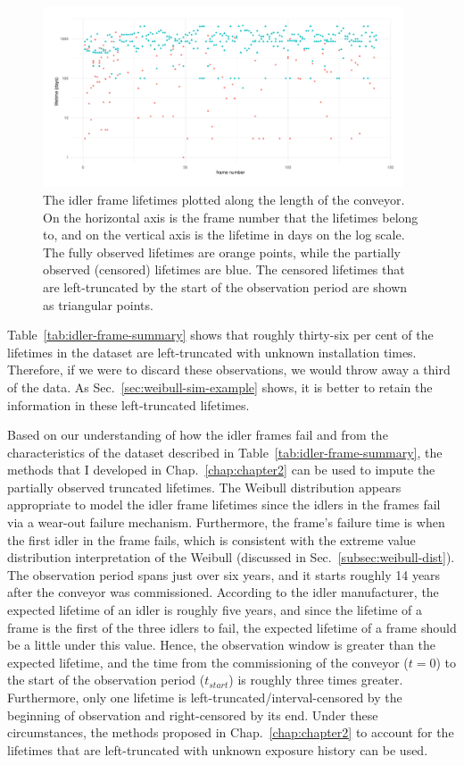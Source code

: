 \begin{figure}[tbp]
  \centering
  \includegraphics[width=0.95\textwidth]{./figures/ch-3/idler-frame-data.pdf}
  \caption{The idler frame lifetimes plotted along the length of the conveyor. On the horizontal axis is the frame number that the lifetimes belong to, and on the vertical axis is the lifetime in days on the log scale. The fully observed lifetimes are orange points, while the partially observed (censored) lifetimes are blue. The censored lifetimes that are left-truncated by the start of the observation period are shown as triangular points.}
  \label{fig:idler-frames-data}
\end{figure}

Table~\ref{tab:idler-frame-summary} shows that roughly thirty-six per cent of the lifetimes in the dataset are left-truncated with unknown installation times. Therefore, if we were to discard these observations, we would throw away a third of the data. As Sec.~\ref{sec:weibull-sim-example} shows, it is better to retain the information in these left-truncated lifetimes.

Based on our understanding of how the idler frames fail and from the characteristics of the dataset described in Table~\ref{tab:idler-frame-summary}, the methods that I developed in Chap.~\ref{chap:chapter2} can be used to impute the partially observed truncated lifetimes. The Weibull distribution appears appropriate to model the idler frame lifetimes since the idlers in the frames fail via a wear-out failure mechanism. Furthermore, the frame's failure time is when the first idler in the frame fails, which is consistent with the extreme value distribution interpretation of the Weibull (discussed in Sec.~\ref{subsec:weibull-dist}). The observation period spans just over six years, and it starts roughly 14 years after the conveyor was commissioned. According to the idler manufacturer, the expected lifetime of an idler is roughly five years, and since the lifetime of a frame is the first of the three idlers to fail, the expected lifetime of a frame should be a little under this value. Hence, the observation window is greater than the expected lifetime, and the time from the commissioning of the conveyor ($t = 0$) to the start of the observation period ($t_{start}$) is roughly three times greater. Furthermore, only one lifetime is left-truncated/interval-censored by the beginning of observation and right-censored by its end. Under these circumstances, the methods proposed in Chap.~\ref{chap:chapter2} to account for the lifetimes that are left-truncated with unknown exposure history can be used.

